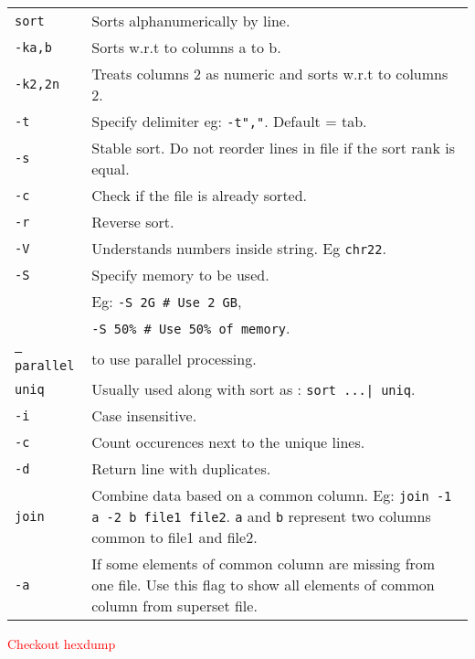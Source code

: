 \begin{tabularx}{\linewidth}{lX}
\texttt{sort} & Sorts alphanumerically by line.\\
\texttt{-ka,b} & Sorts w.r.t to columns a to b.\\
\texttt{-k2,2n} & Treats columns 2 as numeric and sorts w.r.t to columns 2.\\
\texttt{-t} & Specify delimiter eg: \texttt{-t","}. Default = tab.\\
\texttt{-s} & Stable sort. Do not reorder lines in file if the sort rank is equal.\\
\texttt{-c} & Check if the file is already sorted. \\
\texttt{-r} & Reverse sort.\\
\texttt{-V} & Understands numbers inside string. Eg \texttt{chr22}.\\
\texttt{-S} & Specify memory to be used. \\
 & Eg: \texttt{-S 2G \# Use 2 GB}, \\ 
 & \hspace{13pt} \texttt{-S 50\% \# Use 50\% of memory}. \\
\texttt{--parallel} & to use parallel processing.\\
\hline
\texttt{uniq} & Usually used along with sort as : \texttt{sort ...| uniq}.\\
\texttt{-i} & Case insensitive.\\
\texttt{-c} & Count occurences next to the unique lines.\\
\texttt{-d} & Return line with duplicates.\\
\hline
\texttt{join} & Combine data based on a common column. Eg: \texttt{join -1 a -2 b file1 file2}. \texttt{a} and \texttt{b} represent two columns common to file1 and file2. \\
\texttt{-a} & If some elements of common column are missing from one file. Use this flag to show all elements of common column from superset file. \\
\hline

\end{tabularx}

\textcolor{red}{Checkout hexdump}
